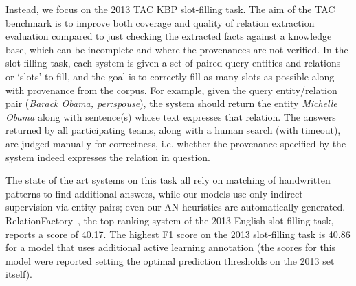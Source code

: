 Instead, we focus on the 2013 TAC KBP slot-filling task. The aim of the TAC benchmark is to improve both coverage and quality of relation extraction evaluation compared to just checking the extracted facts against a knowledge base, which can be incomplete and where the provenances are not verified. In the slot-filling task, each system is given a set of paired query entities and relations or `slots' to fill, and the goal is to correctly fill as many slots as possible along with provenance from the corpus. For example, given the query entity/relation pair (\emph{Barack Obama, per:spouse}), the system should return the entity \emph{Michelle Obama} along with sentence(s) whose text expresses that relation. The answers returned by all participating teams, along with a human search (with timeout), are judged manually for correctness, i.e. whether the provenance specified by the system indeed expresses the relation in question. 


The state of the art systems on this task all rely on matching of handwritten patterns to find additional answers, while our models use only indirect supervision via entity pairs; even our AN heuristics are automatically generated. RelationFactory~\citep{roth2014relationfactory}, the top-ranking system of the 2013 English slot-filling task, reports a score of 40.17. The highest F1 score on the 2013 slot-filling task is 40.86 \citep{angeli2014stanford} for a model that uses additional active learning annotation (the scores for this model were reported setting the optimal prediction thresholds on the 2013 set itself).



